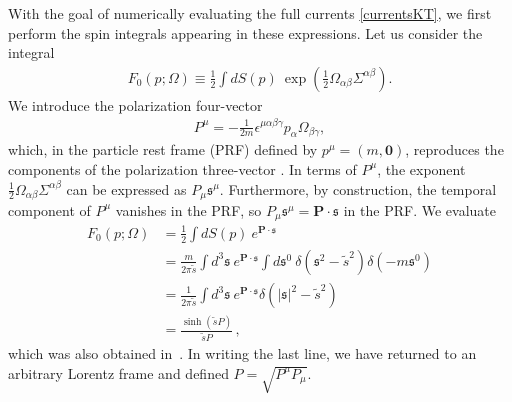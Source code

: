 \documentclass[12pt,aps,prd,nofootinbib,noshowkeys,noshowpacs,longbibliography,
superscriptaddress,tightenlines,floatfix,preprintnumbers]{revtex4-2}
\begin{document}
With the goal of numerically evaluating the full currents \eqref{currentsKT}, we first perform the spin integrals appearing in these expressions. Let us consider the integral
\begin{align}
    F_0(p; \Omega) \equiv \frac{1}{2}\int dS(p)\ \exp\left( \frac{1}{2} \Omega_{\alpha\beta} \Sigma^{\alpha\beta}\right).
\end{align}
We introduce the polarization four-vector
\begin{align}
    P^\mu = -\frac{1}{2m}\epsilon^{\mu\alpha\beta\gamma} p_\alpha \Omega_{\beta\gamma},
\end{align}
which, in the particle rest frame (PRF) defined by $p^\mu = (m, \bm 0)$, reproduces the components of the polarization three-vector \cite{Florkowski:2018fap}. In terms of $P^\mu$, the exponent $\frac{1}{2}\Omega_{\alpha\beta}\Sigma^{\alpha\beta}$ can be expressed as $P_\mu \mathfrak s^\mu$. Furthermore, by construction, the temporal component of $P^\mu$ vanishes in the PRF, so $P_\mu \mathfrak s^\mu = \bm P \cdot  \mathfrak s$ in the PRF. We evaluate
\begin{equation} \label{F0}
    \begin{split}
    F_0(p; \Omega) &= \frac{1}{2}\int dS(p)\ e^{\bm P \cdot \mathfrak  s} \\
    &= \frac{m}{2\pi\tilde{s}}\int d^3 \mathfrak s\ e^{\bm P \cdot \mathfrak s}\int d \mathfrak s^0\ \delta(\mathfrak s^2-\tilde{s}^2)\delta(-m \mathfrak s^0) \\
    &= \frac{1}{2\pi \tilde{s}} \int d^3 \mathfrak s\ e^{\bm P \cdot \mathfrak s}\delta(|\mathfrak s|^2-\tilde{s}^2) \\
    &= \frac{\sinh(\tilde{s} P)}{\tilde{s} P}\,,
    \end{split}
\end{equation}
which was also obtained in~\cite{Florkowski:2018fap}.
In writing the last line, we have returned to an arbitrary Lorentz frame and defined $P= \sqrt{P^\mu P_\mu}$.
\end{document}
